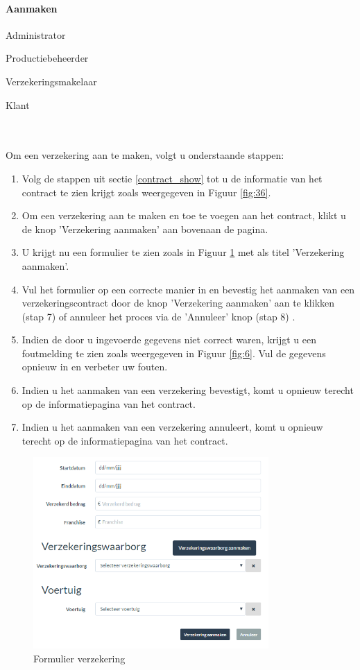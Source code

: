 \documentclass[11pt,openany]{article}
\newcommand{\cmark}{\ding{51}}%
\newcommand{\xmark}{\ding{55}}%
\newcommand{\done}{\rlap{$\square$}{\raisebox{2pt}{\large\hspace{1pt}\cmark}}%
	\hspace{-2.5pt}}
\newcommand{\wontfix}{\rlap{$\square$}{\large\hspace{1pt}\xmark}}
\begin{document}
\paragraph{Aanmaken}
\begin{todolist}
	\item[\done] Administrator
	\item[\done] Productiebeheerder
	\item[\done] Verzekeringsmakelaar
	\item[\wontfix] Klant 
\end{todolist}
\\
\\
Om een verzekering aan te maken, volgt u onderstaande stappen:
\begin{enumerate}
		\item  Volg de stappen uit sectie \ref{contract_show} tot u de informatie van het contract te zien krijgt zoals weergegeven in Figuur \ref{fig:36}.
	\item Om een verzekering aan te maken en toe te voegen aan het contract, klikt u de knop 'Verzekering aanmaken' aan bovenaan de pagina.
	\item U krijgt nu een formulier te zien zoals in Figuur \ref{fig:37} met als titel 'Verzekering aanmaken'.
	\item Vul het formulier op een correcte manier in en bevestig het aanmaken van een verzekeringscontract door de knop 'Verzekering aanmaken' aan te klikken (stap 7) of annuleer het proces via de 'Annuleer' knop (stap 8) .
	\item Indien de door u ingevoerde gegevens niet correct waren, krijgt u een foutmelding te zien zoals weergegeven in Figuur \ref{fig:6}. Vul de gegevens opnieuw in en verbeter uw fouten.
	\item Indien u het aanmaken van een verzekering bevestigt, komt u opnieuw terecht op de informatiepagina van het contract.
	\item Indien u het aanmaken van een verzekering annuleert, komt u opnieuw terecht op de informatiepagina van het contract.
\end{enumerate}
\begin{figure}
	\centering
	\includegraphics[width=0.8\textwidth]{img/fig37.png}
	\caption{Formulier verzekering} 
	\label{fig:37} 
\end{figure}
\end{document}
